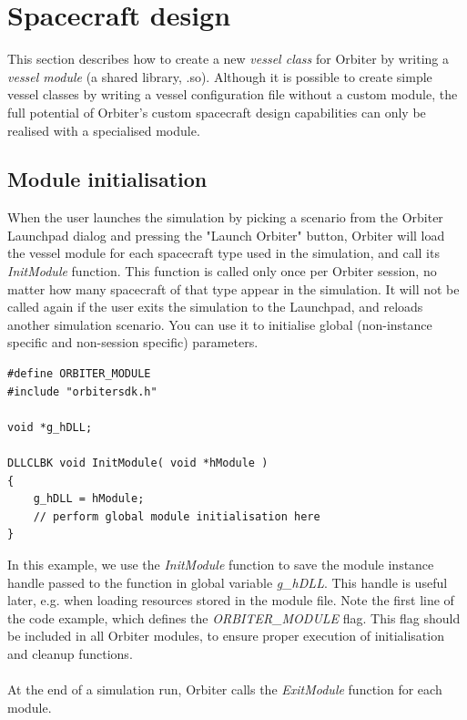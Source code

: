 \documentclass[Orbiter Developer Manual.tex]{subfiles}
\begin{document}
\section{Spacecraft design}
This section describes how to create a new \textit{vessel class} for Orbiter by writing a \textit{vessel module} (a shared library, .so). Although it is possible to create simple vessel classes by writing a vessel configuration file without a custom module, the full potential of Orbiter's custom spacecraft design capabilities can only be realised with a specialised module.\\



\subsection{Module initialisation}
When the user launches the simulation by picking a scenario from the Orbiter Launchpad dialog and pressing the "Launch Orbiter" button, Orbiter will load the vessel module for each spacecraft type used in the simulation, and call its \textit{InitModule} function. This function is called only once per Orbiter session, no matter how many spacecraft of that type appear in the simulation. It will not be called again if the user exits the simulation to the Launchpad, and reloads another simulation scenario. You can use it to initialise global (non-instance specific and non-session specific) parameters.

\begin{lstlisting}
#define ORBITER_MODULE
#include "orbitersdk.h"

void *g_hDLL;

DLLCLBK void InitModule( void *hModule )
{
	g_hDLL = hModule;
	// perform global module initialisation here
}
\end{lstlisting}

\noindent
In this example, we use the \textit{InitModule} function to save the module instance handle passed to the function in global variable \textit{g\_hDLL}. This handle is useful later, e.g. when loading resources stored in the module file. Note the first line of the code example, which defines the \textit{ORBITER\_MODULE} flag. This flag should be included in all Orbiter modules, to ensure proper execution of initialisation and cleanup functions.\\
\\
At the end of a simulation run, Orbiter calls the \textit{ExitModule} function for each module.
\end{document}
